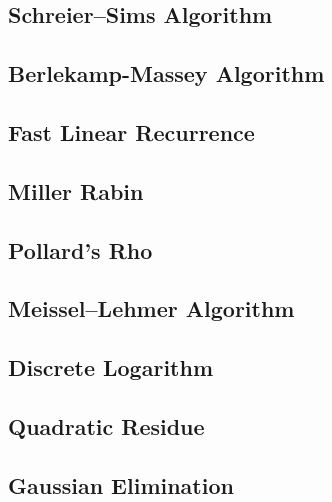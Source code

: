 \documentclass[a4paper,10pt,twocolumn,oneside]{article}
\begin{document}
\subsection{Schreier–Sims Algorithm}

\subsection{Berlekamp-Massey Algorithm}

\subsection{Fast Linear Recurrence}

% 
\subsection{Miller Rabin}

\subsection{Pollard's Rho}

\subsection{Meissel–Lehmer Algorithm}

\subsection{Discrete Logarithm}

\subsection{Quadratic Residue}

\subsection{Gaussian Elimination}

% 
\end{document}
